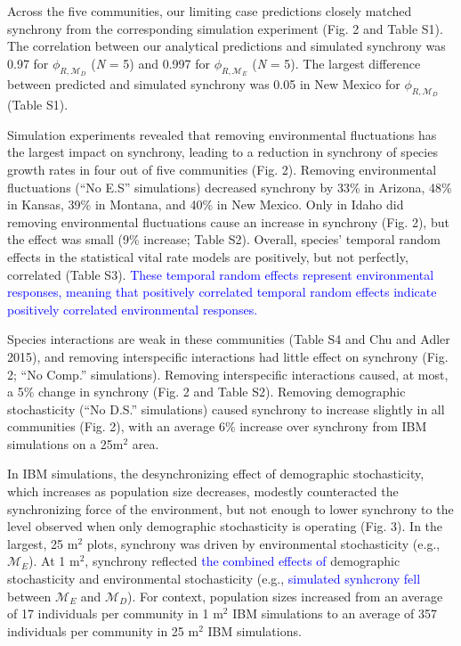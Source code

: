 \documentclass[12pt,]{article}
\begin{document}
Across the five communities, our limiting case predictions closely
matched synchrony from the corresponding simulation experiment (Fig. 2
and Table S1). The correlation between our analytical predictions and
simulated synchrony was 0.97 for \(\phi_{R,\mathcal{M}_D}\) (\emph{N} =
5) and 0.997 for \(\phi_{R,\mathcal{M}_E}\) (\emph{N} = 5). The largest
difference between predicted and simulated synchrony was 0.05 in New
Mexico for \(\phi_{R,\mathcal{M}_D}\) (Table S1).

Simulation experiments revealed that removing environmental fluctuations
has the largest impact on synchrony, leading to a reduction in synchrony
of species growth rates in four out of five communities (Fig. 2).
Removing environmental fluctuations (``No E.S'' simulations) decreased
synchrony by 33\% in Arizona, 48\% in Kansas, 39\% in Montana, and 40\%
in New Mexico. Only in Idaho did removing environmental fluctuations
cause an increase in synchrony (Fig. 2), but the effect was small (9\%
increase; Table S2). Overall, species' temporal random effects in the
statistical vital rate models are positively, but not perfectly,
correlated (Table S3).
\textcolor{blue}{These temporal random effects represent environmental responses, meaning that positively correlated temporal random effects indicate positively correlated environmental responses.}

Species interactions are weak in these communities (Table S4 and Chu and
Adler 2015), and removing interspecific interactions had little effect
on synchrony (Fig. 2; ``No Comp.'' simulations). Removing interspecific
interactions caused, at most, a 5\% change in synchrony (Fig. 2 and
Table S2). Removing demographic stochasticity (``No D.S.'' simulations)
caused synchrony to increase slightly in all communities (Fig. 2), with
an average 6\% increase over synchrony from IBM simulations on a
25\(\text{m}^2\) area.

In IBM simulations, the desynchronizing effect of demographic
stochasticity, which increases as population size decreases, modestly
counteracted the synchronizing force of the environment, but not enough
to lower synchrony to the level observed when only demographic
stochasticity is operating (Fig. 3). In the largest, 25 \(\text{m}^2\)
plots, synchrony was driven by environmental stochasticity (e.g.,
\(\mathcal{M}_E\)). At 1 \(\text{m}^2\), synchrony reflected
\textcolor{blue}{the combined effects of} demographic stochasticity and
environmental stochasticity (e.g.,
\textcolor{blue}{simulated synhcrony fell} between \(\mathcal{M}_E\) and
\(\mathcal{M}_D\)). For context, population sizes increased from an
average of 17 individuals per community in 1 \(\text{m}^2\) IBM
simulations to an average of 357 individuals per community in 25
\(\text{m}^2\) IBM simulations.
\end{document}
